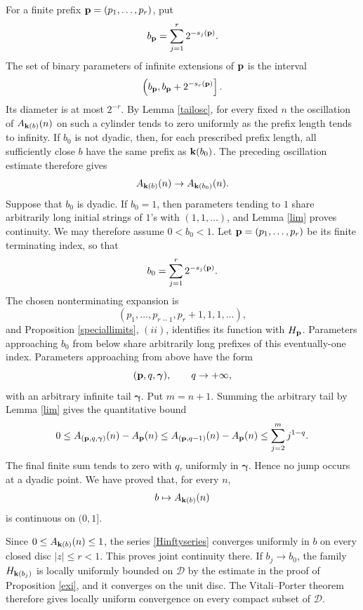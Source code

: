 \documentclass[12pt,a4paper]{amsart}
\makeatletter
\numberwithin{equation}{section}
\renewenvironment{proof}[1][Proof]{%
  \par\pushQED{\qed}%
  \normalfont\topsep6\p@\@plus6\p@\relax
  \trivlist
  \item[\hskip\labelsep\bfseries #1:]\ignorespaces
}{%
  \popQED\endtrivlist\@endpefalse
}
\theoremstyle{plain}
\theoremstyle{definition}
\makeatother
\begin{document}
\begin{proof}
For a finite prefix ${\bf p}=(p_1,\ldots,p_r)$, put
\[
b_{\bf p}=\sum_{j=1}^{r}2^{-s_j({\bf p})}.
\]
The set of binary parameters of infinite extensions of ${\bf p}$ is the interval
\begin{equation}\label{cylinderinterval}
\left(b_{\bf p},b_{\bf p}+2^{-s_r({\bf p})}\right].
\end{equation}
Its diameter is at most $2^{-r}$.  By Lemma \ref{tailosc}, for every fixed $n$ the oscillation of
$A_{{\bf k}(b)}(n)$ on such a cylinder tends to zero uniformly as the prefix length tends to infinity.
If $b_0$ is not dyadic, then, for each prescribed prefix length, all sufficiently close $b$ have the same prefix as ${\bf k}(b_0)$.  The preceding oscillation estimate therefore gives
\[
A_{{\bf k}(b)}(n)\rightarrow A_{{\bf k}(b_0)}(n).
\]
Suppose that $b_0$ is dyadic.  If $b_0=1$, then parameters tending to $1$ share arbitrarily long initial strings of $1$'s with $(1,1,\ldots)$, and Lemma \ref{lim} proves continuity.  We may therefore assume $0<b_0<1$.  Let ${\bf p}=(p_1,\ldots,p_r)$ be its finite terminating index, so that
\[
b_0=\sum_{j=1}^{r}2^{-s_j({\bf p})}.
\]
The chosen nonterminating expansion is
\[
(p_1,\ldots,p_{r-1},p_r+1,1,1,\ldots),
\]
and Proposition \ref{speciallimits}, $(ii)$, identifies its function with $H_{\bf p}$.  Parameters approaching $b_0$ from below share arbitrarily long prefixes of this eventually-one index.  Parameters approaching from above have the form
\[
({\bf p},q,{\boldsymbol\gamma}),
\qquad q\rightarrow+\infty,
\]
with an arbitrary infinite tail ${\boldsymbol\gamma}$.  Put $m=n+1$.  Summing the arbitrary tail by Lemma \ref{lim} gives the quantitative bound
\begin{equation}\label{dyadicuniform}
0\leq A_{({\bf p},q,{\boldsymbol\gamma})}(n)-A_{\bf p}(n)
\leq A_{({\bf p},q-1)}(n)-A_{\bf p}(n)
\leq\sum_{j=2}^{m}j^{1-q}.
\end{equation}
The final finite sum tends to zero with $q$, uniformly in ${\boldsymbol\gamma}$.  Hence no jump occurs at a dyadic point.  We have proved that, for every $n$,
\[
b\mapsto A_{{\bf k}(b)}(n)
\]
is continuous on $(0,1]$.

Since $0\leq A_{{\bf k}(b)}(n)\leq1$, the series \eqref{Hinftyseries} converges uniformly in $b$ on every closed disc $|z|\leq r<1$.  This proves joint continuity there.  If $b_j\rightarrow b_0$, the family $H_{{\bf k}(b_j)}$ is locally uniformly bounded on $\mathcal{D}$ by the estimate in the proof of Proposition \ref{exi}, and it converges on the unit disc.  The Vitali--Porter theorem therefore gives locally uniform convergence on every compact subset of $\mathcal{D}$.


\end{proof}
\end{document}
